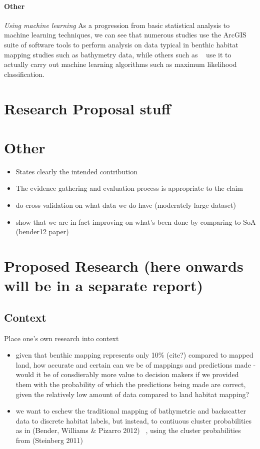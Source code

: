             \paragraph{Other}
            \textit{Using machine learning} As a progression from basic statistical analysis to machine learning techniques, we can see that numerous studies use the ArcGIS suite of software tools to perform analysis on data typical in benthic habitat mapping studies such as bathymetry data, while others such as ~\citet{micallef12} use it to actually carry out machine learning algorithms such as maximum likelihood classification. 

\section{Research Proposal stuff}
\section{Other}
\begin{itemize}
    \item States clearly the intended contribution
    \item The evidence gathering and evaluation process is appropriate to the claim
\end{itemize}

\begin{itemize}
    \item do cross validation on what data we do have (moderately large dataset)
    \item show that we are in fact improving on what's been done by comparing to SoA (bender12 paper)
\end{itemize}        


\section{Proposed Research (here onwards will be in a separate report)}
\subsection{Context}
Place one's own research into context
\begin{itemize}
    \item given that benthic mapping represents only 10\% (cite?) compared to mapped land, how accurate and certain can we be of mappings and predictions made - would it be of consdierably more value to decision makers if we provided them with the probability of which the predictions being made are correct, given the relatively low amount of data compared to land habitat mapping?
    \item we want to eschew the traditional mapping of bathymetric and backscatter data to discrete habitat labels, but instead, to contiuous cluster probabilities as in (Bender, Williams \& Pizarro 2012) ~\citep{bender12}, using the cluster probabilities from (Steinberg 2011) ~\citep{steinberg11}
\end{itemize}

